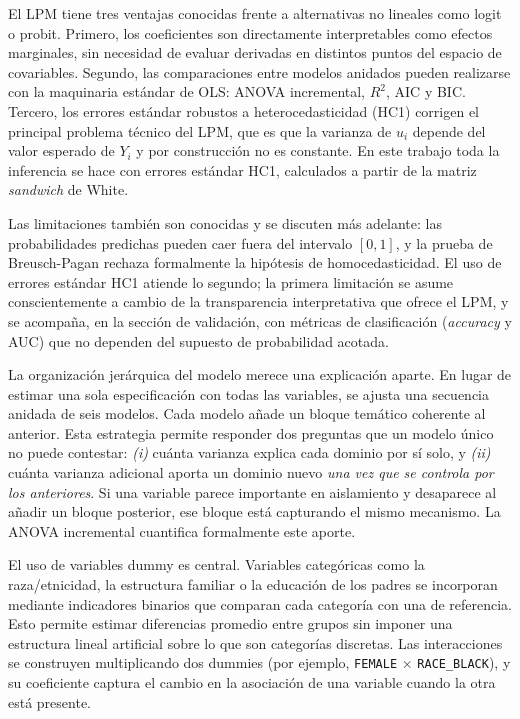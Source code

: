 \documentclass[11pt]{article}
\begin{document}
El LPM tiene tres ventajas conocidas frente a alternativas no lineales como logit o probit. Primero, los coeficientes son directamente interpretables como efectos marginales, sin necesidad de evaluar derivadas en distintos puntos del espacio de covariables. Segundo, las comparaciones entre modelos anidados pueden realizarse con la maquinaria estándar de OLS: ANOVA incremental, $R^2$, AIC y BIC. Tercero, los errores estándar robustos a heterocedasticidad (HC1) corrigen el principal problema técnico del LPM, que es que la varianza de $u_i$ depende del valor esperado de $Y_i$ y por construcción no es constante. En este trabajo toda la inferencia se hace con errores estándar HC1, calculados a partir de la matriz \textit{sandwich} de White.

Las limitaciones también son conocidas y se discuten más adelante: las probabilidades predichas pueden caer fuera del intervalo $[0,1]$, y la prueba de Breusch-Pagan rechaza formalmente la hipótesis de homocedasticidad. El uso de errores estándar HC1 atiende lo segundo; la primera limitación se asume conscientemente a cambio de la transparencia interpretativa que ofrece el LPM, y se acompaña, en la sección de validación, con métricas de clasificación (\textit{accuracy} y AUC) que no dependen del supuesto de probabilidad acotada.

La organización jerárquica del modelo merece una explicación aparte. En lugar de estimar una sola especificación con todas las variables, se ajusta una secuencia anidada de seis modelos. Cada modelo añade un bloque temático coherente al anterior. Esta estrategia permite responder dos preguntas que un modelo único no puede contestar: \textit{(i)} cuánta varianza explica cada dominio por sí solo, y \textit{(ii)} cuánta varianza adicional aporta un dominio nuevo \textit{una vez que se controla por los anteriores}. Si una variable parece importante en aislamiento y desaparece al añadir un bloque posterior, ese bloque está capturando el mismo mecanismo. La ANOVA incremental cuantifica formalmente este aporte.

El uso de variables dummy es central. Variables categóricas como la raza/etnicidad, la estructura familiar o la educación de los padres se incorporan mediante indicadores binarios que comparan cada categoría con una de referencia. Esto permite estimar diferencias promedio entre grupos sin imponer una estructura lineal artificial sobre lo que son categorías discretas. Las interacciones se construyen multiplicando dos dummies (por ejemplo, \texttt{FEMALE} $\times$ \texttt{RACE\_BLACK}), y su coeficiente captura el cambio en la asociación de una variable cuando la otra está presente.
\end{document}
